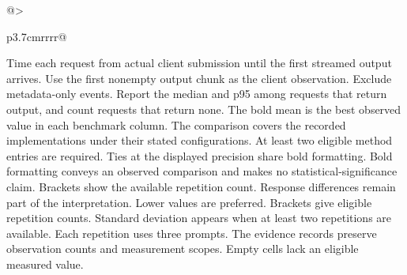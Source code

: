 \documentclass[conference,onecolumn]{IEEEtran}
\begin{document}
\begin{table}[!htp]
\begin{tabular}{@{}>{\raggedright\arraybackslash}p{3.7cm}rrrr@{}}
\bottomrule
\end{tabular}\par\medskip
\begin{minipage}{\linewidth}\footnotesize
Time each request from actual client submission until the first streamed output arrives. Use the first nonempty output chunk as the client observation. Exclude metadata-only events. Report the median and p95 among requests that return output, and count requests that return none.
The bold mean is the best observed value in each benchmark column. The comparison covers the recorded implementations under their stated configurations. At least two eligible method entries are required. Ties at the displayed precision share bold formatting. Bold formatting conveys an observed comparison and makes no statistical-significance claim. Brackets show the available repetition count. Response differences remain part of the interpretation. Lower values are preferred.
Brackets give eligible repetition counts. Standard deviation appears when at least two repetitions are available. Each repetition uses three prompts. The evidence records preserve observation counts and measurement scopes. Empty cells lack an eligible measured value.
\end{minipage}
\end{table}
\end{document}
